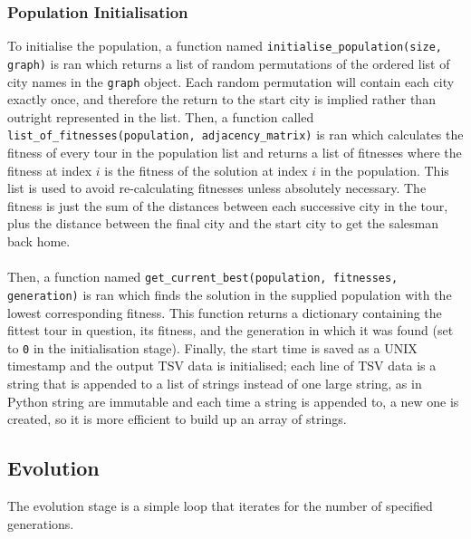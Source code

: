 \documentclass[a4paper]{article}
\begin{document}
\subsubsection{Population Initialisation}
To initialise the population, a function named \texttt{initialise_population(size, graph)} is ran which returns a list of random permutations of the ordered list of city names in the \texttt{graph} object.
Each random permutation will contain each city exactly once, and therefore the return to the start city is implied rather than outright represented in the list.
Then, a function called \texttt{list\_of\_fitnesses(population, adjacency\_matrix)} is ran which calculates the fitness of every tour in the population list and returns a list of fitnesses where the fitness at index $i$ is the fitness of the solution at index $i$ in the population.
This list is used to avoid re-calculating fitnesses unless absolutely necessary. 
The fitness is just the sum of the distances between each successive city in the tour, plus the distance between the final city and the start city to get the salesman back home.
\\\\
Then, a function named \texttt{get_current_best(population, fitnesses, generation)} is ran which finds the solution in the supplied population with the lowest corresponding fitness.
This function returns a dictionary containing the fittest tour in question, its fitness, and the generation in which it was found (set to \verb|0| in the initialisation stage).
Finally, the start time is saved as a UNIX timestamp and the output TSV data is initialised;
each line of TSV data is a string that is appended to a list of strings instead of one large string, as in Python string are immutable and each time a string is appended to, a new one is created, so it is more efficient to build up an array of strings.

\subsection{Evolution}
The evolution stage is a simple loop that iterates for the number of specified generations.
\end{document}
